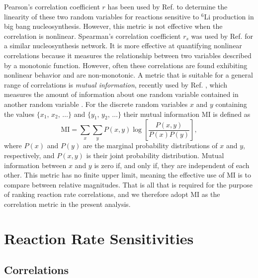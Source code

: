 Pearson's correlation coefficient $r$ has been used by Ref. \cite{Coc2014} to determine the linearity of these two random variables for reactions sensitive to $^{6}$Li production in big bang nucleosynthesis. However, this metric is not effective when the correlation is nonlinear. Spearman's correlation coefficient $r_{s}$ was used by Ref. \cite{Iliadis2015b} for a similar nucleosynthesis network. It is more effective at quantifying nonlinear correlations because it measures the relationship between two variables described by a monotonic function. However, often these correlations are found exhibiting nonlinear behavior and are non-monotonic. A metric that is suitable for a general range of correlations is \emph{mutual information}, recently used by Ref. \cite{Iliadis2020}, which measures the amount of information about one random variable contained in another random variable \cite{Cover2006}. For the discrete random variables $x$ and $y$ containing the values $\{x_{1}, \, x_{2}, \, \ldots\}$ and $\{y_{1}, \, y_{2}, \, \ldots\}$ their mutual information MI is defined as
\begin{equation} \label{eqn:mutual_info}
\mathrm{MI} = \sum_{x} \sum_{y} P(x,y) \log \left[ \frac{P(x,y)}{P(x)P(y)} \right],
\end{equation}
where $P(x)$ and $P(y)$ are the marginal probability distributions of $x$ and $y$, respectively, and $P(x,y)$ is their joint probability distribution. Mutual information between $x$ and $y$ is zero if, and only if, they are independent of each other. This metric has no finite upper limit, meaning the effective use of MI is to compare between relative magnitudes. That is all that is required for the purpose of ranking reaction rate correlations, and we therefore adopt MI as the correlation metric in the present analysis.

\section{Reaction Rate Sensitivities} \label{sec:rate_sensitivities}

\subsection{Correlations} \label{subsec:Corr}

